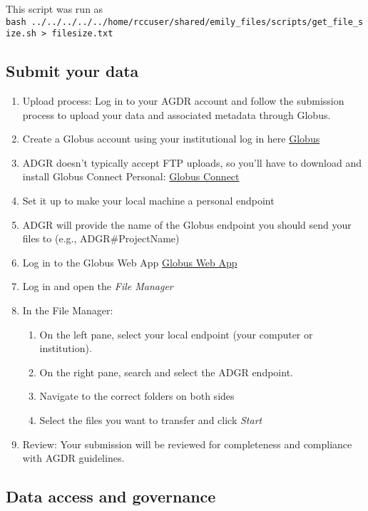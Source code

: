 \documentclass[
]{article}
\begin{document}
This script was run as
\texttt{bash\ ../../../../../home/rccuser/shared/emily\_files/scripts/get\_file\_size.sh\ \textgreater{}\ filesize.txt}

\hypertarget{submit-your-data}{%
\subsection{Submit your data}\label{submit-your-data}}

\begin{enumerate}
\def\labelenumi{\arabic{enumi}.}
\item
  Upload process: Log in to your AGDR account and follow the submission
  process to upload your data and associated metadata through Globus.
\item
  Create a Globus account using your institutional log in here
  \href{https://www.globus.org/}{Globus}
\item
  ADGR doesn't typically accept FTP uploads, so you'll have to download
  and install Globus Connect Personal:
  \href{https://www.globus.org/globus-connect-personal}{Globus Connect}
\item
  Set it up to make your local machine a personal endpoint
\item
  ADGR will provide the name of the Globus endpoint you should send your
  files to (e.g., ADGR\#ProjectName)
\item
  Log in to the Globus Web App \href{https://app.globus.org/}{Globus Web
  App}
\item
  Log in and open the \emph{File Manager}
\item
  In the File Manager:

  \begin{enumerate}
  \def\labelenumii{\alph{enumii})}
  \item
    On the left pane, select your local endpoint (your computer or
    institution).
  \item
    On the right pane, search and select the ADGR endpoint.
  \item
    Navigate to the correct folders on both sides
  \item
    Select the files you want to transfer and click \emph{Start}
  \end{enumerate}
\item
  Review: Your submission will be reviewed for completeness and
  compliance with AGDR guidelines.
\end{enumerate}

\hypertarget{data-access-and-governance}{%
\subsection{Data access and
governance}\label{data-access-and-governance}}
\end{document}
